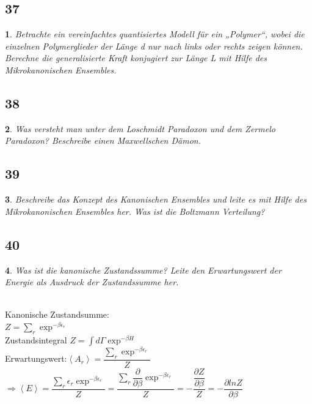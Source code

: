 \documentclass[12pt,a4paper]{report}
\newtheorem{myfrag}{}%
\begin{document}
\subsection{37}
\begin{myfrag}
Betrachte ein vereinfachtes quantisiertes Modell für ein „Polymer“, wobei die
einzelnen Polymerglieder der Länge d nur nach links oder rechts zeigen können.
Berechne die generalisierte Kraft konjugiert zur Länge L mit Hilfe des
Mikrokanonischen Ensembles.
\end{myfrag}
\subsection{38}
\begin{myfrag}
Was versteht man unter dem Loschmidt Paradoxon und dem Zermelo Paradoxon?
Beschreibe einen Maxwellschen Dämon.
\end{myfrag}
\subsection{39}
\begin{myfrag}
Beschreibe das Konzept des Kanonischen Ensembles und leite es mit Hilfe des
Mikrokanonischen Ensembles her. Was ist die Boltzmann Verteilung?
\end{myfrag}
\subsection{40}
\begin{myfrag}
Was ist die kanonische Zustandssumme? Leite den Erwartungswert der Energie
als Ausdruck der Zustandssumme her.
\end{myfrag} \quad \\
Kanonische Zustandsumme: \\
$ Z= \sum \limits_r \exp ^{-\beta \epsilon _r} $ \quad \\ Zustandsintegral  $Z = \int d \Gamma \exp ^{-\beta H} $ \\[1ex]
Erwartungswert:$ \left\langle A_r \right\rangle = \dfrac{\sum _r \exp ^{-\beta \epsilon _r}}{Z}$ \\[1ex]
$\Rightarrow \left\langle E \right\rangle = \dfrac{\sum _r \epsilon _r \exp ^{-\beta \epsilon _r}}{Z} = \dfrac{\sum _r \dfrac{\partial}{\partial \beta} \exp ^{-\beta \epsilon _r}}{Z} = -\dfrac{\dfrac{\partial Z}{\partial \beta}}{Z} = - \dfrac{\partial lnZ}{\partial \beta}$
\end{document}
